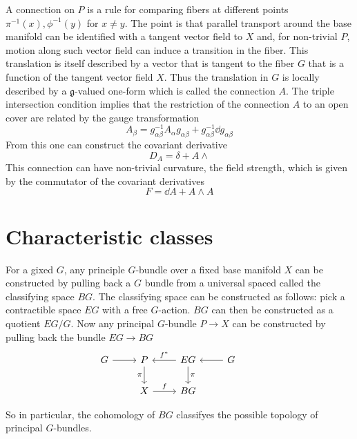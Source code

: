 A connection on $P$ is a rule for comparing fibers at different points $\pi^{-1}(x),\phi^{-1}(y)$ for $x\neq y$. The point is that parallel transport around the base manifold can be identified with a tangent vector field to $X$ and, for non-trivial $P$, motion along such vector field can induce a transition in the fiber. This translation is itself described by a vector that is tangent to the fiber $G$ that is a function of the tangent vector field $X$. Thus the translation in $G$ is locally described by a $\mathfrak{g}$-valued one-form which is called the connection $A$. The triple intersection condition implies that the restriction of the connection $A$ to an open cover are related by the gauge transformation 
\begin{equation}
    A_\beta=g^{-1}_{\alpha \beta} A_\alpha g_{\alpha \beta}+ g_{\alpha \beta}^{-1}\dd{g}_{\alpha \beta}
\end{equation}
From this one can construct the covariant derivative 
\begin{equation}
    D_A=\delta+A\wedge
\end{equation}
This connection can have non-trivial curvature, the field strength, which is given by the commutator of the covariant derivatives 
\begin{equation}
    F=\dd{A}+A\wedge A
\end{equation}
\section{Characteristic classes}
\begin{proposition}
    For a gixed $G$, any principle $G$-bundle over a fixed base manifold $X$ can be constructed by pulling back a $G$ bundle from a universal spaced called the classifying space $BG$. The classifying space can be constructed as follows: pick a contractible space $EG$ with a free $G$-action. $BG$ can then be constructed as a quotient $EG/G$. Now any principal $G$-bundle $P\rightarrow X$ can be constructed by pulling back the bundle $EG\rightarrow BG$ 
    \begin{equation}
        \begin{tikzcd}
            G \arrow{r}{} & P  \arrow[swap]{d}{\pi} &\arrow[swap]{l}{f^*}EG \arrow{d}{\pi} &\arrow{l} G \\
            &X\arrow{r}{f}&BG & &
    \end{tikzcd}
    \end{equation}
\end{proposition}
So in particular, the cohomology of $BG$ classifyes the possible topology of principal $G$-bundles.

